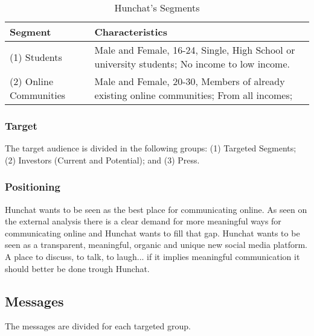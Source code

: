 \documentclass[12pt]{article}
\begin{document}
\begin{table}[htbp]
\small
\caption{Hunchat's Segments}
\label{table:seg}
\centering
\begin{tabular}{ @{}P{0.2\textwidth}P{0.7\textwidth}@{} }
Segment	&	Characteristics	\\ \hline
(1) Students	&	Male and Female, 16-24, Single, High School or university students; No income to low income. \\
(2) Online Communities	& Male and Female, 20-30, Members of already existing online communities; From all incomes;
 \\ \hline
\end{tabular}
\end{table}

\subsubsection{Target}
The target audience is divided in the following groups: (1) Targeted Segments; (2) Investors (Current and Potential); and (3) Press.

\subsubsection{Positioning}
Hunchat wants to be seen as the best place for communicating online. As seen on the external analysis there is a clear demand for more meaningful ways for communicating online and Hunchat wants to fill that gap. Hunchat wants to be seen as a transparent, meaningful, organic and unique new social media platform. A place to discuss, to talk, to laugh... if it implies meaningful communication it should better be done trough Hunchat.


\subsection{Messages}
The messages are divided for each targeted group.
\end{document}
